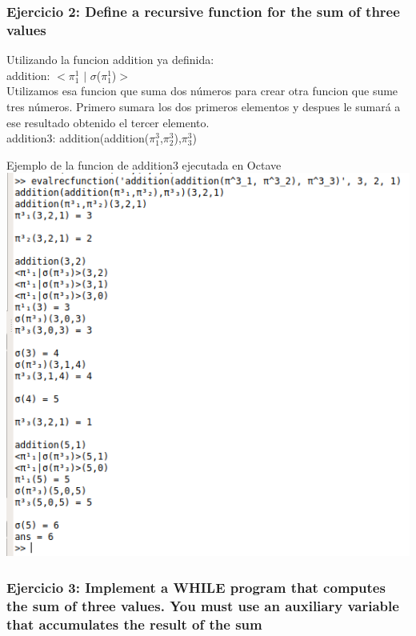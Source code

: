 \documentclass[fleqn, 10pt]{article}
\theoremstyle{plain}
\theoremstyle{definition}
\begin{document}
\subsubsection*{Ejercicio 2: Define a recursive function for the sum of three values}

Utilizando la funcion addition ya definida:
\\
addition: $<$$\pi^1_1$ $|$ $\sigma$($\pi^1_1$)$>$
\\
Utilizamos esa funcion que suma dos números para crear otra funcion que sume tres números. Primero sumara los dos primeros elementos y despues le sumará a ese resultado obtenido el tercer elemento.
\\
addition3: addition(addition($\pi^3_1$,$\pi^3_2$),$\pi^3_3$) 

\begin{center}
Ejemplo de la funcion de addition3 ejecutada en Octave
\\
	\includegraphics[scale=0.41]{addition3}
\end{center}


\subsubsection*{Ejercicio 3: Implement a WHILE program that computes the sum of three values. You must use an auxiliary variable that accumulates the result of the sum}

\begin{whilecode}[H]
\end{whilecode}
\end{document}
